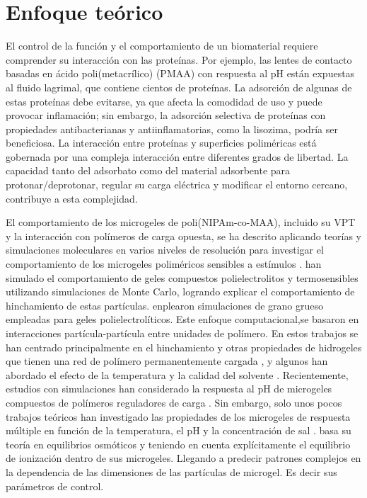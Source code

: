 \section{Enfoque te\'orico}


El control de la funci\'on y el comportamiento de un biomaterial requiere comprender su interacci\'on con las prote\'inas.%
 Por ejemplo, las lentes de contacto basadas en \'acido poli(metacr\'ilico) (PMAA) con respuesta al pH est\'an expuestas al fluido lagrimal, que contiene cientos de prote\'inas. La adsorci\'on de algunas de estas prote\'inas debe evitarse, ya que afecta la comodidad de uso y puede provocar inflamaci\'on; sin embargo, la adsorci\'on selectiva de prote\'inas con propiedades antibacterianas y antiinflamatorias, como la lisozima, podr\'ia ser beneficiosa. 
La interacci\'on entre prote\'inas y superficies polim\'ericas est\'a gobernada por una compleja interacci\'on entre diferentes grados de libertad. La capacidad tanto del adsorbato como del material adsorbente para protonar/deprotonar, regular su carga el\'ectrica y modificar el entorno cercano, contribuye a esta complejidad.

El comportamiento de los microgeles de poli(NIPAm-co-MAA), incluido su VPT y la interacci\'on con pol\'imeros de carga opuesta, se ha descrito aplicando teor\'ias  y simulaciones moleculares en varios niveles de resoluci\'on para investigar el comportamiento de los microgeles polim\'ericos sensibles a est\'imulos \cite{ahualli2016coarse,Landsgesell2019SM}.
\citet{quesada2011gel} han simulado el comportamiento de geles compuestos  polielectrolitos y termosensibles utilizando  simulaciones de Monte Carlo, logrando explicar el comportamiento de hinchamiento de estas part\'iculas.
\citet{ahualli2016coarse}
enplearon simulaciones de grano grueso empleadas para geles polielectrol\'iticos. Este enfoque computacional,se basaron en interacciones part\'icula-partícula entre unidades de pol\'imero. 
En estos trabajos se han centrado principalmente en el hinchamiento y otras propiedades de hidrogeles que tienen una red de pol\'imero permanentemente cargada , y algunos han abordado el efecto de la temperatura y la calidad del solvente \cite{Jha2011, QuesadaPerez2013, moncho-jorda2016a, ahualli2016coarse, AdroherBenitez2017PCCP}.
Recientemente, estudios  con simulaciones han considerado la respuesta al pH de microgeles compuestos de pol\'imeros reguladores de carga \cite{Schroeder2015,Rud2017,Sean2018, Hofzumahaus2018,Lu2019}.
Sin embargo, solo unos pocos trabajos te\'oricos han investigado las propiedades de los microgeles de respuesta m\'ultiple en funci\'on de la temperatura, el pH y la concentraci\'on de sal  \cite{CaprilesGonzalez2008,polotsky2013collapse}.
\citet{polotsky2013collapse} basa su teor\'ia en equilibrios osm\'oticos y teniendo en cuenta expl\'icitamente el equilibrio de ionizaci\'on dentro de sus microgeles. Llegando a predecir patrones complejos en la dependencia de las dimensiones de las part\'iculas de microgel. Es decir sus par\'ametros de control.
	

